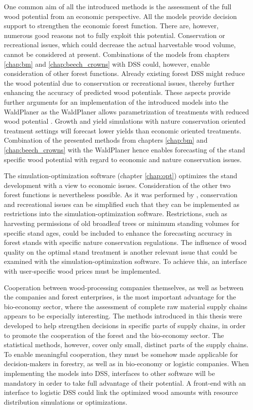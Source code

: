 One common aim of all the introduced methods is the assessment of the full wood potential from an economic perspective. All the models provide decision support to strengthen the economic forest function. There are, however, numerous good reasons not to fully exploit this potential. Conservation or recreational issues, which could decrease the actual harvestable wood volume, cannot be considered at present. Combinations of the models from chapters \ref{chap:bm} and \ref{chap:beech_crowns} with DSS could, however, enable consideration of other forest functions. Already existing forest DSS might reduce the wood potential due to conservation or recreational issues, thereby further enhancing the accuracy of predicted wood potentials. These aspects provide further arguments for an implementation of the introduced models into the WaldPlaner as the WaldPlaner allows parametrization of treatments with reduced wood potential \citep[p. 90-93]{hansen_2014}. Growth and yield simulations with nature conservation oriented treatment settings will forecast lower yields than economic oriented treatments. Combination of the presented methods from chapters \ref{chap:bm} and \ref{chap:beech_crowns} with the WaldPlaner hence enables forecasting of the stand specific wood potential with regard to economic and nature conservation issues.

The si\-mu\-la\-tion-op\-ti\-mi\-za\-tion software (chapter \ref{chap:opt}) optimizes the stand development with a view to economic issues. Consideration of the other two forest functions is nevertheless possible. As it was performed by \citet{yousefpour_2009}, conservation and recreational issues can be simplified such that they can be implemented as restrictions into the si\-mu\-la\-tion-op\-ti\-mi\-za\-tion software. Restrictions, such as harvesting permissions of old broadleaf trees or minimum standing volumes for specific stand ages, could be included to enhance the forecasting accuracy in forest stands with specific nature conservation regulations. The influence of wood quality on the optimal stand treatment is another relevant issue that could be examined with the si\-mu\-la\-tion-op\-ti\-mi\-za\-tion software. To achieve this, an interface with user-specific wood prices must be implemented.

Cooperation between wood-processing companies themselves, as well as between the companies and forest enterprises, is the most important advantage for the bio-economy sector, where the assessment of complete raw material supply chains appears to be especially interesting. The methods introduced in this thesis were developed to help strengthen decisions in specific parts of supply chains, in order to promote the cooperation of the forest and the bio-economy sector. The statistical methods, however, cover only small, distinct parts of the supply chains. To enable meaningful cooperation, they must be somehow made applicable for decision-makers in forestry, as well as in bio-economy or logistic companies. When implementing the models into DSS, interfaces to other software will be mandatory in order to take full advantage of their potential. A front-end with an interface to logistic DSS could link the optimized wood amounts with resource distribution simulations or optimizations.